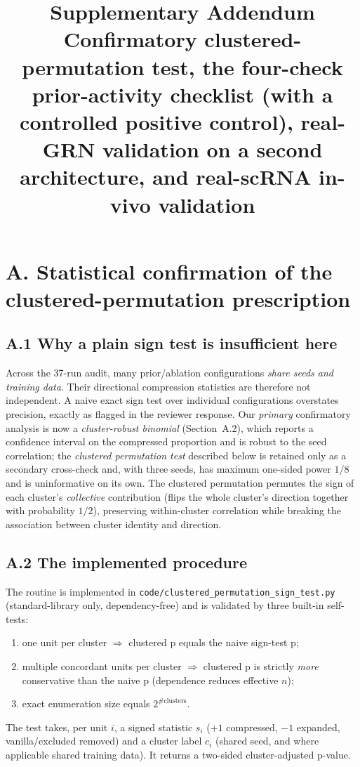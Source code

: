 \documentclass[11 pt,a4 paper]{article}
\title{\textbf{Supplementary Addendum}\\[0.3 em]
\large Confirmatory clustered-permutation test, the four-check prior-activity checklist (with a controlled positive control), real-GRN validation on a second architecture, and real-scRNA in-vivo validation}
\author{}
\date{}
\begin{document}
\maketitle

\section*{A. Statistical confirmation of the clustered-permutation prescription}

\subsection*{A.1 Why a plain sign test is insufficient here}
Across the 37-run audit, many prior/ablation configurations \emph{share seeds and
training data}. Their directional compression statistics are therefore not
independent. A naive exact sign test over individual configurations
overstates precision, exactly as flagged in the reviewer response. Our \emph{primary}
confirmatory analysis is now a \emph{cluster-robust binomial} (Section~A.2), which
reports a confidence interval on the compressed proportion and is robust to the
seed correlation; the \emph{clustered permutation test} described below is
retained only as a secondary cross-check and, with three seeds, has maximum
one-sided power $1/8$ and is uninformative on its own. The clustered permutation
permutes the sign of each cluster's \emph{collective} contribution (flips the
whole cluster's direction together with probability $1/2$), preserving
within-cluster correlation while breaking the association between cluster
identity and direction.

\subsection*{A.2 The implemented procedure}
The routine is implemented in \texttt{code/clustered\_permutation\_sign\_test.py}
(standard-library only, dependency-free) and is validated by three built-in
self-tests:
\begin{enumerate}[leftmargin=1.4 em]
\item one unit per cluster $\Rightarrow$ clustered p equals the naive sign-test p;
\item multiple concordant units per cluster $\Rightarrow$ clustered p is strictly
 \emph{more} conservative than the naive p (dependence reduces effective $n$);
\item exact enumeration size equals $2^{\#\text{clusters}}$.
\end{enumerate}
The test takes, per unit $i$, a signed statistic $s_i$ ($+1$ compressed,
$-1$ expanded, vanilla/excluded removed) and a cluster label $c_i$ (shared seed,
and where applicable shared training data). It returns a two-sided
cluster-adjusted p-value.
\end{document}
